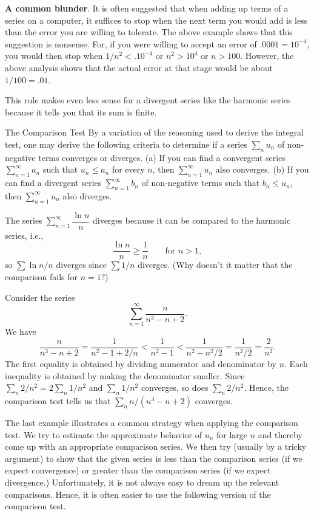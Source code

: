 {\bf A common blunder}.   It is often suggested that when adding
up terms of a series on a computer, it suffices to stop when
the next term you would add  is less than the error you
are willing to tolerate.  The above example shows that this
suggestion is nonsense.  For, if you were willing to accept
an error of $.0001 = 10^{-4}$, you would then stop when $1/n^2 < .10^{-4}$
 or
$n^2 > 10^4$ or $n > 100$.  However, the above analysis shows
that the actual error at that stage would be about $1/100 = .01$.

This rule makes even less sense for a divergent series like the
harmonic series because it tells you that its sum is finite.  

\subhead The Comparison Test \endsubhead
By a variation of the reasoning used to derive the
integral test, one may derive the following criteria to
%
determine if a series $\sum_n u_n$
of non-negative terms converges or diverges.
\medskip
(a)  If you can find a convergent series $\sum_{n=1}^\infty a_n$
such that $u_n \le a_n$ for every $n$, then $\sum_{n=1}^\infty u_n$
also converges.
  \smallskip
(b)  If you can find a divergent series $\sum_{n=1}^\infty b_n$
of non-negative terms such that $b_n \le u_n$, then
$\sum_{n=1}^\infty u_n$ also diverges.
\medskip


\nextex
{}
The series
$\sum_{n=1}^\infty \dfrac {\ln n}{n}$ diverges because
it can be compared to the harmonic series, i.e.,
$$
   \frac{\ln n}n \ge \frac 1n\qquad\text{for } n > 1,
$$
so $\sum \ln n/n$ diverges since $\sum 1/n$ diverges.
(Why doesn't it matter that the comparison fails for $n = 1$?)
\endexample

\nextex
{}  Consider the series
$$
\sum_{n=1}^\infty \frac n{n^3 -n + 2}.
$$
We have
$$
\frac n{n^3 - n + 2} = \frac 1{n^2 - 1 + 2/n} < \frac 1{n^2 -1} 
 < \frac 1{n^2 - n^2/2} = \frac 1{n^2/2} = \frac 2{n^2}.
$$
The first equality is obtained by dividing numerator and denominator
by $n$.  Each inequality is obtained by making the
denominator smaller.   Since $\sum_n 2/n^2 = 2\sum_n 1/n^2$
and $\sum_n 1/n^2$ converges, so does $\sum_n 2/n^2$.  Hence, the
comparison test tells us that $\sum_n n/(n^3 - n + 2)$ converges.
\endexample

The last example illustrates a common strategy when
applying the comparison test.
We try to estimate the approximate behavior of $u_n$ for large
$n$ and thereby come up with an appropriate comparison series.
We then try (usually by a tricky argument) to show that the given
series is less than the comparison series (if we expect convergence)
or greater than the comparison series (if we expect divergence.)
Unfortunately, it is not always easy to dream up the relevant
comparisons.  Hence, it is often easier to use the following
version of the comparison test.

